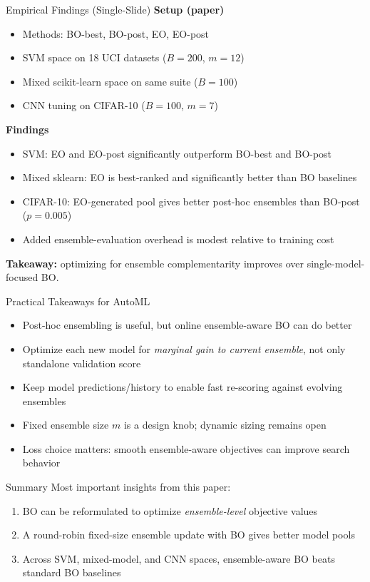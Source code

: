 \documentclass[main]{subfiles}
\begin{document}
\begin{frame}{Empirical Findings (Single-Slide)}
\scriptsize
\textbf{Setup (paper)}
\begin{itemize}
    \item Methods: BO-best, BO-post, EO, EO-post
    \item SVM space on 18 UCI datasets ($B=200$, $m=12$)
    \item Mixed scikit-learn space on same suite ($B=100$)
    \item CNN tuning on CIFAR-10 ($B=100$, $m=7$)
\end{itemize}
\vspace{0.1cm}
\textbf{Findings}
\begin{itemize}
    \item SVM: EO and EO-post significantly outperform BO-best and BO-post
    \item Mixed sklearn: EO is best-ranked and significantly better than BO baselines
    \item CIFAR-10: EO-generated pool gives better post-hoc ensembles than BO-post ($p=0.005$)
    \item Added ensemble-evaluation overhead is modest relative to training cost
\end{itemize}
\textbf{Takeaway:} optimizing for ensemble complementarity improves over single-model-focused BO.
\end{frame}

\begin{frame}{Practical Takeaways for AutoML}
\small
\begin{itemize}
    \item Post-hoc ensembling is useful, but online ensemble-aware BO can do better
    \item Optimize each new model for \emph{marginal gain to current ensemble}, not only standalone validation score
    \item Keep model predictions/history to enable fast re-scoring against evolving ensembles
    \item Fixed ensemble size $m$ is a design knob; dynamic sizing remains open
    \item Loss choice matters: smooth ensemble-aware objectives can improve search behavior
\end{itemize}
\end{frame}

\begin{frame}{Summary}
Most important insights from this paper:
\begin{enumerate}
    \item BO can be reformulated to optimize \emph{ensemble-level} objective values
    \item A round-robin fixed-size ensemble update with BO gives better model pools
    \item Across SVM, mixed-model, and CNN spaces, ensemble-aware BO beats standard BO baselines
\end{enumerate}
\end{frame}
\end{document}

